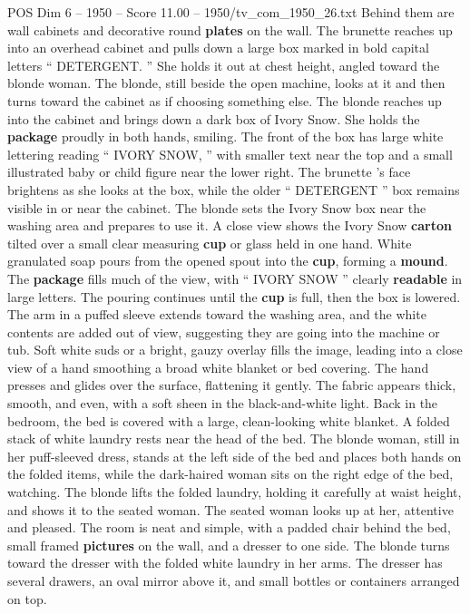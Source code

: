 \begin{textsample}{POS Dim 6 – 1950 – Score 11.00 – 1950/tv\_com\_1950\_26.txt}
Behind them are wall cabinets and decorative round \textbf{plates} on the wall.
The brunette reaches up into an overhead cabinet and pulls down a large box marked in bold capital letters “ DETERGENT. ” She holds it out at chest height, angled toward the blonde woman.
The blonde, still beside the open machine, looks at it and then turns toward the cabinet as if choosing something else.
The blonde reaches up into the cabinet and brings down a dark box of Ivory Snow.
She holds the \textbf{package} proudly in both hands, smiling.
The front of the box has large white lettering reading “ IVORY SNOW, ” with smaller text near the top and a small illustrated baby or child figure near the lower right.
The brunette ’s face brightens as she looks at the box, while the older “ DETERGENT ” box remains visible in or near the cabinet.
The blonde sets the Ivory Snow box near the washing area and prepares to use it.
A close view shows the Ivory Snow \textbf{carton} tilted over a small clear measuring \textbf{cup} or glass held in one hand.
White granulated soap pours from the opened spout into the \textbf{cup}, forming a \textbf{mound}.
The \textbf{package} fills much of the view, with “ IVORY SNOW ” clearly \textbf{readable} in large letters.
The pouring continues until the \textbf{cup} is full, then the box is lowered.
The arm in a puffed sleeve extends toward the washing area, and the white contents are added out of view, suggesting they are going into the machine or tub.
Soft white suds or a bright, gauzy overlay fills the image, leading into a close view of a hand smoothing a broad white blanket or bed covering.
The hand presses and glides over the surface, flattening it gently.
The fabric appears thick, smooth, and even, with a soft sheen in the black-and-white light.
Back in the bedroom, the bed is covered with a large, clean-looking white blanket.
A folded stack of white laundry rests near the head of the bed.
The blonde woman, still in her puff-sleeved dress, stands at the left side of the bed and places both hands on the folded items, while the dark-haired woman sits on the right edge of the bed, watching.
The blonde lifts the folded laundry, holding it carefully at waist height, and shows it to the seated woman.
The seated woman looks up at her, attentive and pleased.
The room is neat and simple, with a padded chair behind the bed, small framed \textbf{pictures} on the wall, and a dresser to one side.
The blonde turns toward the dresser with the folded white laundry in her arms.
The dresser has several drawers, an oval mirror above it, and small bottles or containers arranged on top.

\end{textsample}
